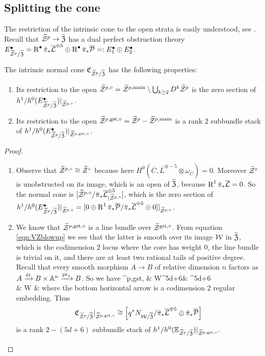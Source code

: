 \subsection{Splitting the cone} The restriction of the intrinsic cone to the open strata is easily understood, see \cite[Lemma 4.3]{CL-pfields}. Recall that $\widetilde{\mathcal Z}^p\rightarrow\widetilde{\mathfrak Z}$ has a dual perfect obstruction theory $E^{\bullet}_{\widetilde{\mathcal Z}^p/\widetilde{\mathfrak Z}}=\operatorname{R}^{\bullet}\bar\pi_*\overline{\mathcal{L}}^{\oplus 5}\oplus\operatorname{R}^{\bullet}\bar\pi_*\overline{\mathcal P}=:E^{\bullet}_1\oplus E^{\bullet}_2$.
\begin{lem}\label{lem:open_cones}
The intrinsic normal cone $\mathfrak{C}_{\widetilde{\mathcal Z}^p/\widetilde{\mathfrak Z}}$ has the following properties:
\begin{enumerate}
\item Its restriction to the open $\widetilde{\mathcal Z}^{p,\circ}= \widetilde{\mathcal Z}^{p,\rm{main}}\setminus \bigcup_{k\geq 2}D^k \widetilde{\mathcal Z}^p$ is the zero section of $h^1/h^0(E^{\bullet}_{\widetilde{\mathcal Z}^p/\widetilde{\mathfrak Z}})\rvert_{\widetilde{\mathcal Z}^{p,\circ}}$.
\item Its restriction to the open $\widetilde{\mathcal Z}^{p,\rm{gst},\circ}=\widetilde{\mathcal Z}^p - \widetilde{\mathcal Z}^{p,\rm{main}}$  is a rank $2$ subbundle stack of $h^1/h^0(E^{\bullet}_{\widetilde{\mathcal Z}^p/\widetilde{\mathfrak Z}})\rvert_{\widetilde{\mathcal Z}^{p,\rm{gst},\circ}}$.
\end{enumerate}
\end{lem}
\begin{proof}\begin{enumerate}[leftmargin=.8cm]
\item Observe that $\widetilde{\mathcal Z}^{p,\circ}\cong \widetilde{\mathcal Z}^{\circ}$ because here $H^0(\overline{C}, \overline{L}^{\otimes -5}\otimes \omega_{\overline{C}})=0$. Moreover $\widetilde{\mathcal Z}^{\circ}$ is unobstructed on its image, which is an open of $\widetilde{\mathfrak Z}$, because $\operatorname{R}^1\bar{\pi}_*\overline{\mathcal{L}}=0$.
So the normal cone is $[\widetilde{\mathcal Z}^{p,\circ}/\bar{\pi}_*\overline{\mathcal{L}}^{\oplus 5}_{\rvert\widetilde{\mathcal Z}^{p,\circ}}]$, which is the zero section of $h^1/h^0(E^{\bullet}_{\widetilde{\mathcal Z}^p/\widetilde{\mathfrak Z}})\rvert_{\widetilde{\mathcal Z}^{p,\circ}}=[0\oplus \operatorname{R}^1\bar{\pi}_*\overline{\mathcal P}/\bar{\pi}_*\overline{\mathcal{L}}^{\oplus 5}\oplus 0]\rvert_{\widetilde{\mathcal Z}^{p,\circ}}$.

\item We know that $\widetilde{\mathcal Z}^{p,\rm{gst},\circ}$ is a line bundle over $\widetilde{\mathcal Z}^{\rm{gst},\circ}$. From equation \ref{eqn:VZblowup} we see that the latter is smooth over its image $\mathcal W$ in $\widetilde{\mathfrak Z}$, which is the codimension $2$ locus where the core has weight $0$, the line bundle is trivial on it, and there are at least two rational tails of positive degree. Recall that every smooth morphism $A\to B$ of relative dimension $n$ factors as $A\xrightarrow{\acute{e}t} B\times \mathbb{A}^n\xrightarrow{\operatorname{pr}_1} B$. So we have
\bcd
\tZ^{p,\rm{gst},\circ} \ar[r,"\acute{e}t"] & \pazocal W\times\Aaff^{5d+6}\ar[r,hook]\ar[d,"q"] & \tXP\times \Aaff^{5d+6}\ar[d] \\
& \pazocal W \ar[r,hook] & \tXP
\ecd
where the bottom horizontal arrow is a codimension $2$ regular embedding. Thus 
\[\mathfrak{C}_{\widetilde{\mathcal Z}^p/\widetilde{\mathfrak Z}}\rvert_{\widetilde{\mathcal Z}^{p,\rm{gst},\circ}}\cong \left[ q^* N_{\mathcal W/\widetilde{\mathfrak Z}}/ \bar{\pi}_*\overline{\mathcal{L}}^{\oplus 5}\oplus\bar{\pi}_*\overline{\mathcal P}\right]\]
is a rank $2-(5d+6)$ subbundle stack of  $h^1/h^0(\mathbb E_{\widetilde{\mathcal Z}^p/\widetilde{\mathfrak Z}})\rvert_{\widetilde{\mathcal Z}^{p,\rm{gst},\circ}}.$
\end{enumerate}
\end{proof}
